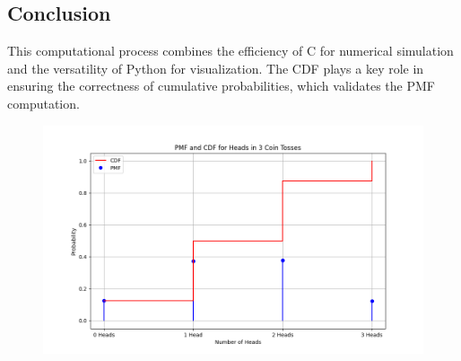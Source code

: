 \documentclass[journal]{IEEEtran}
\begin{document}
\begin{enumerate}
\section*{Conclusion}
This computational process combines the efficiency of C for numerical simulation and the versatility of Python for visualization. The CDF plays a key role in ensuring the correctness of cumulative probabilities, which validates the PMF computation.
\begin{figure}[H]
    \centering
    \includegraphics[width=\columnwidth]{figs/fig.png}
\end{figure}
\end{enumerate}
\end{document}
